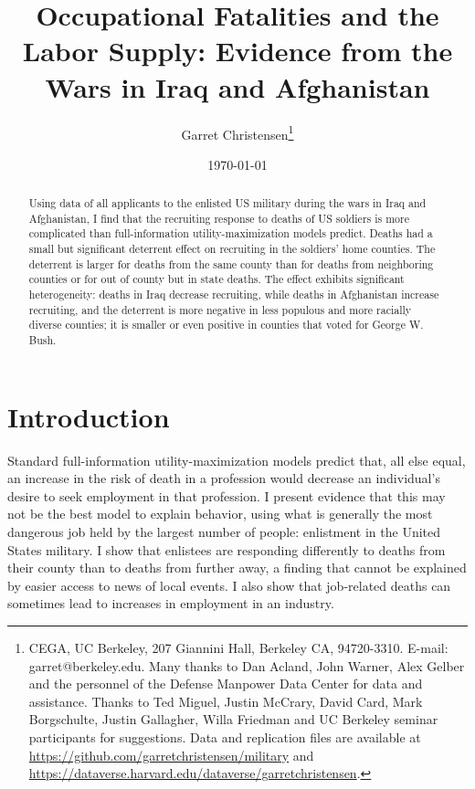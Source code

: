 \documentclass[12pt] {article}
\begin{document}
\title{Occupational Fatalities and the Labor Supply: Evidence from the Wars in Iraq and
Afghanistan}
\date{\today}
\author{Garret Christensen\thanks{
CEGA, UC Berkeley, 207 Giannini Hall, Berkeley CA, 94720-3310. E-mail: garret@berkeley.edu. 
Many thanks to Dan Acland, John Warner, Alex Gelber and the personnel
of the Defense Manpower Data Center for data and assistance. Thanks
to Ted Miguel, Justin McCrary, David Card, Mark Borgschulte, Justin
Gallagher, Willa Friedman and UC Berkeley seminar participants for
suggestions. Data and replication files are available at \url{https://github.com/garretchristensen/military} and \url{https://dataverse.harvard.edu/dataverse/garretchristensen}.}}
\maketitle



\begin{abstract}

Using data of all applicants to the enlisted US military during the wars in Iraq and Afghanistan, I find that the recruiting response to deaths of US soldiers is more complicated than full-information utility-maximization models predict. Deaths had a small but significant deterrent effect on recruiting in the soldiers' home counties. The deterrent is larger for deaths from the same county than for deaths from neighboring counties or for out of county but in state deaths. %
The effect exhibits significant heterogeneity: deaths in Iraq decrease recruiting, while deaths in Afghanistan increase recruiting, and the deterrent is more negative in less populous and more racially diverse counties; it is smaller or even positive in counties that voted for George W. Bush.

\end{abstract}




\section{Introduction\label{sec:Introduction}}
Standard full-information utility-maximization models predict that, all else equal, an increase in the risk of death in a profession would decrease an individual's desire to seek employment in that profession. I present evidence that this may not be the best model to explain behavior, using what is generally the most dangerous job held by the largest number of people: enlistment in the United States military. I show that enlistees are responding differently to deaths from their county than to deaths from further away, a finding that cannot be explained by easier access to news of local events. I also show that job-related deaths can sometimes lead to increases in employment in an industry.
\end{document}
